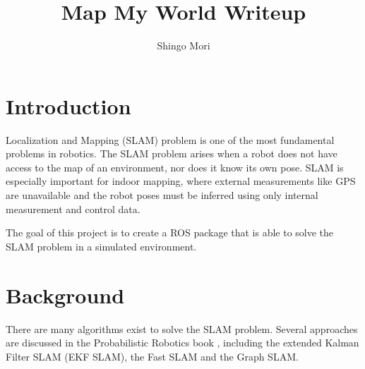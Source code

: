 \documentclass[10pt,journal,compsoc]{IEEEtran}
\begin{document}
\title{Map My World Writeup}

\author{Shingo Mori}

%
{}


\maketitle
\IEEEdisplaynontitleabstractindextext
\IEEEpeerreviewmaketitle
\section{Introduction}
\label{sec:introduction}

 Localization and Mapping (SLAM) problem is one of the most fundamental problems in robotics. The SLAM problem arises when a robot does not have access to the map of an environment, nor does it know its own pose. SLAM is especially important for indoor mapping, where external measurements like GPS are unavailable and the robot poses must be inferred using only internal measurement and control data.

The goal of this project is to create a ROS package that is able to solve the SLAM problem in a simulated environment.

\section{Background}
There are many algorithms exist to solve the SLAM problem. Several approaches are discussed in the Probabilistic Robotics book \cite{Thrun:2005:PR:1121596}, including the extended Kalman Filter SLAM (EKF SLAM), the Fast SLAM and the Graph SLAM.
\end{document}
